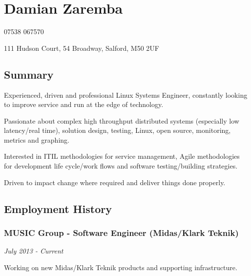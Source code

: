 \section{Damian Zaremba}

07538 067570

111 Hudson Court, 54 Broadway, Salford, M50 2UF

\subsection{Summary}

Experienced, driven and professional Linux Systems Engineer, constantly
looking to improve service and run at the edge of technology.

Passionate about complex high throughput distributed systems (especially
low latency/real time), solution design, testing, Linux, open source,
monitoring, metrics and graphing.

Interested in ITIL methodologies for service management, Agile
methodologies for development life cycle/work flows and software
testing/building strategies.

Driven to impact change where required and deliver things done properly.

\subsection{Employment History}

\subsubsection{MUSIC Group - Software Engineer (Midas/Klark Teknik)}

\emph{July 2013 - Current}

Working on new Midas/Klark Teknik products and supporting
infrastructure.

